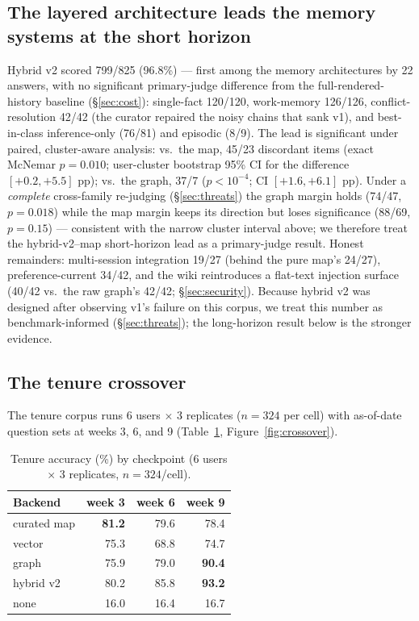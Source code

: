 \subsection{The layered architecture leads the memory systems at the short
horizon}
\label{sec:layered}

Hybrid v2 scored 799/825 (96.8\%) --- first among the memory architectures
by 22 answers, with no significant primary-judge difference from the
full-rendered-history baseline (\S\ref{sec:cost}): single-fact
120/120, work-memory 126/126, conflict-resolution 42/42 (the curator
repaired the noisy chains that sank v1), and best-in-class inference-only
(76/81) and episodic (8/9). The lead is significant under paired,
cluster-aware analysis: vs.\ the map, 45/23 discordant items (exact McNemar
$p=0.010$; user-cluster bootstrap 95\% CI for the difference $[+0.2,+5.5]$
pp); vs.\ the graph, 37/7 ($p<10^{-4}$; CI $[+1.6,+6.1]$ pp). Under a
\emph{complete} cross-family re-judging (\S\ref{sec:threats}) the graph
margin holds (74/47, $p=0.018$) while the map margin keeps its direction
but loses significance (88/69, $p=0.15$) --- consistent with the narrow
cluster interval above; we therefore treat the hybrid-v2--map short-horizon
lead as a primary-judge result. Honest
remainders: multi-session integration 19/27 (behind the pure map's 24/27),
preference-current 34/42, and the wiki reintroduces a flat-text injection
surface (40/42 vs.\ the raw graph's 42/42; \S\ref{sec:security}). Because
hybrid v2 was designed after observing v1's failure on this corpus, we treat
this number as benchmark-informed (\S\ref{sec:threats}); the long-horizon
result below is the stronger evidence.

\subsection{The tenure crossover}
\label{sec:crossover}

The tenure corpus runs 6 users $\times$ 3 replicates ($n{=}324$ per cell) with
as-of-date question sets at weeks 3, 6, and 9
(Table~\ref{tab:crossover}, Figure~\ref{fig:crossover}).

\begin{table}[t]
\centering
\small
\caption{Tenure accuracy (\%) by checkpoint (6 users $\times$ 3 replicates,
$n{=}324$/cell).}
\label{tab:crossover}
\begin{tabular}{lrrr}
\toprule
Backend & week 3 & week 6 & week 9 \\
\midrule
curated map & \textbf{81.2} & 79.6 & 78.4 \\
vector      & 75.3 & 68.8 & 74.7 \\
graph       & 75.9 & 79.0 & \textbf{90.4} \\
hybrid v2   & 80.2 & 85.8 & \textbf{93.2} \\
none        & 16.0 & 16.4 & 16.7 \\
\bottomrule
\end{tabular}
\end{table}

